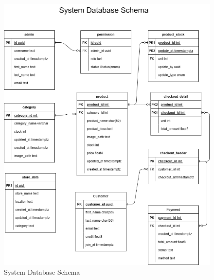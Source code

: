 \begin{figure}[h]
  \begin{center}

    \includegraphics[scale=0.5]{pic/database.png}
  \end{center}

  \caption[System Database Schema]{System Database Schema}
  \label{fig:Database Schema}
\end{figure}

